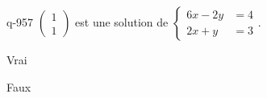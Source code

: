 \begin{truefalse}{q-957}
$\begin{pmatrix}1\\1\end{pmatrix}$ est une solution de $\begin{cases}6x-2y &= 4 \\ 2x+y &= 3\end{cases}$.
\item* Vrai
\item Faux
\end{truefalse}

